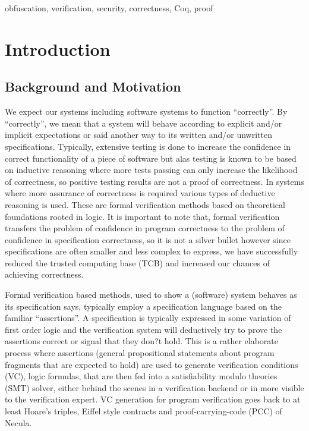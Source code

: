 \documentclass[compsoc,conference,a4paper,10pt,times]{IEEEtran}
\begin{document}
\begin{IEEEkeywords}
obfuscation, verification, security, correctness, Coq, proof
\end{IEEEkeywords}

\section{Introduction}
\subsection{Background and Motivation}
We expect our systems including software systems to function ``correctly''. By ``correctly'', we mean that a system will behave according to explicit and/or implicit expectations or said another way to its written and/or unwritten specifications. Typically, extensive testing is done to increase the confidence in correct functionality of a piece of software but alas testing is known to be based on inductive reasoning where more tests passing can only increase the likelihood of correctness, so positive testing results are not a proof of correctness. In systems where more assurance of correctness is required various types of deductive reasoning is used. These are formal verification methods based on theoretical foundations rooted in logic. It is important to note that, formal verification transfers the problem of confidence in program correctness to the problem of confidence in specification correctness, so it is not a silver bullet however since specifications are often smaller and less complex to express, we have successfully reduced the trusted computing base (TCB) and increased our chances of achieving correctness.

Formal verification based methods, used to show a (software) system behaves as its specification says, typically employ a specification language based on the familiar ``assertions''. A specification is typically expressed in some variation of first order logic and the verification system will deductively try to prove the assertions correct or signal that they don?t hold. This is a rather elaborate process where assertions (general propositional statements about program fragments that are expected to hold) are used to generate verification conditions (VC), logic formulas, that are then fed into a satisfiability modulo theories (SMT) solver, either behind the scenes in a verification backend or in more visible to the verification expert. VC generation for program verification goes back to at least Hoare's triples, Eiffel style contracts and proof-carrying-code (PCC) of Necula\cite{b7}.
\end{document}
